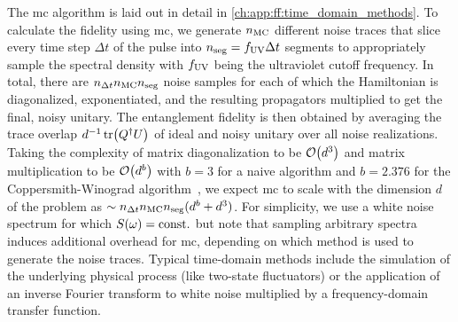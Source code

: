 The \gls{mc} algorithm is laid out in detail in \cref{ch:app:ff:time_domain_methods}.
To calculate the fidelity using \gls{mc}, we generate $n_{\mathrm{MC}}$ different noise traces that slice every time step $\Delta t$ of the pulse into $n_{\mathrm{seg}} = f_{\mathrm{UV}}\Delta t$ segments to appropriately sample the spectral density with $f_{\mathrm{UV}}$ being the ultraviolet cutoff frequency.
In total, there are $n_{\Delta t} n_{\mathrm{MC}} n_{\mathrm{seg}}$ noise samples for each of which the Hamiltonian is diagonalized, exponentiated, and the resulting propagators multiplied to get the final, noisy unitary.
The entanglement fidelity is then obtained by averaging the trace overlap $d^{-1}\tr(Q^\dagger U)$ of ideal and noisy unitary over all noise realizations.
Taking the complexity of matrix diagonalization to be $\order{d^3}$ and matrix multiplication to be $\order{d^b}$ with $b = 3$ for a naive algorithm and $b = \num{2.376}$ for the Coppersmith-Winograd algorithm~\cite{Coppersmith1990}, we expect \gls{mc} to scale with the dimension $d$ of the problem as $\sim n_{\Delta t} n_{\mathrm{MC}} n_{\mathrm{seg}} (d^b + d^3)$.
For simplicity, we use a white noise spectrum for which $S(\omega) = \mathrm{const.}$ but note that sampling arbitrary spectra induces additional overhead for \gls{mc}, depending on which method is used to generate the noise traces.
Typical time-domain methods include the simulation of the underlying physical process (like two-state fluctuators) or the application of an inverse Fourier transform to white noise multiplied by a frequency-domain transfer function.

